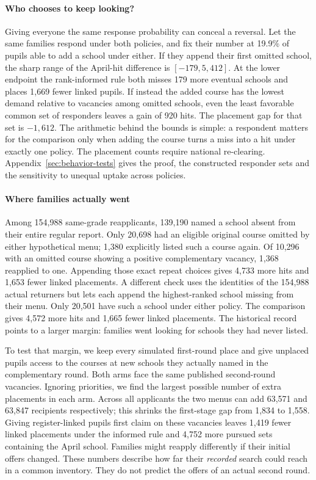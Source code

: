 \paragraph{Who chooses to keep looking?}
Giving everyone the same response probability can conceal a reversal. Let the same families respond under both policies, and fix their number at 19.9\% of pupils able to add a school under either. If they append their first omitted school, the sharp range of the April-hit difference is $[-179,5{,}412]$. At the lower endpoint the rank-informed rule both misses 179 more eventual schools and places 1,669 fewer linked pupils. If instead the added course has the lowest demand relative to vacancies among omitted schools, even the least favorable common set of responders leaves a gain of 920 hits. The placement gap for that set is $-1{,}612$. The arithmetic behind the bounds is simple: a respondent matters for the comparison only when adding the course turns a miss into a hit under exactly one policy. The placement counts require national re-clearing. Appendix~\ref{sec:behavior-tests} gives the proof, the constructed responder sets and the sensitivity to unequal uptake across policies.

\paragraph{Where families actually went}
Among 154,988 same-grade reapplicants, 139,190 named a school absent from their entire regular report. Only 20,698 had an eligible original course omitted by either hypothetical menu; 1,380 explicitly listed such a course again. Of 10,296 with an omitted course showing a positive complementary vacancy, 1,368 reapplied to one. Appending those exact repeat choices gives 4,733 more hits and 1,653 fewer linked placements. A different check uses the identities of the 154,988 actual returners but lets each append the highest-ranked school missing from their menu. Only 20,501 have such a school under either policy. The comparison gives 4,572 more hits and 1,665 fewer linked placements. The historical record points to a larger margin: families went looking for schools they had never listed.

To test that margin, we keep every simulated first-round place and give unplaced pupils access to the courses at new schools they actually named in the complementary round. Both arms face the same published second-round vacancies. Ignoring priorities, we find the largest possible number of extra placements in each arm. Across all applicants the two menus can add 63,571 and 63,847 recipients respectively; this shrinks the first-stage gap from 1,834 to 1,558. Giving register-linked pupils first claim on these vacancies leaves 1,419 fewer linked placements under the informed rule and 4,752 more pursued sets containing the April school. Families might reapply differently if their initial offers changed. These numbers describe how far their \emph{recorded} search could reach in a common inventory. They do not predict the offers of an actual second round.


